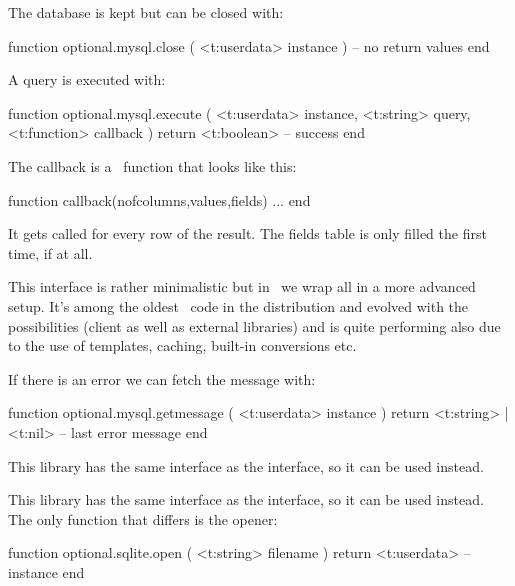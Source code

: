 The database is kept  but can be closed with:

\starttyping[option=LUA]
function optional.mysql.close ( <t:userdata> instance )
    -- no return values
end
\stoptyping

A query is executed with:

\starttyping[option=LUA]
function optional.mysql.execute (
    <t:userdata> instance,
    <t:string>   query,
    <t:function> callback
)
    return <t:boolean> -- success
end
\stoptyping

The callback is a \LUA\ function that looks like this:

\starttyping[option=LUA]
function callback(nofcolumns,values,fields)
    ...
end
\stoptyping

It gets called for every row of the result. The fields table is only filled the
first time, if at all.

This interface is rather minimalistic but in \CONTEXT\ we wrap all in a more
advanced setup. It's among the oldest \LUA\ code in the distribution and evolved
with the possibilities (client as well as external libraries) and is quite
performing also due to the use of templates, caching, built-in conversions etc.

If there is an error we can fetch the message with:

\starttyping[option=LUA]
function optional.mysql.getmessage ( <t:userdata> instance )
    return <t:string> | <t:nil> -- last error message
end
\stoptyping

\stopsubsubsubject

\startsubsubsubject[title=postgress]

This library has the same interface as the  interface, so it can be
used instead.

\stopsubsubsubject

\startsubsubsubject[title=sqlite]

This library has the same interface as the  interface, so it can be
used instead. The only function that differs is the opener:

\starttyping[option=LUA]
function optional.sqlite.open ( <t:string> filename )
    return <t:userdata> -- instance
end
\stoptyping

\stopsubsubsubject

\stopsubsection

\startsubsection[title=Whatever]

\startsubsubsubject[title=cerf]

